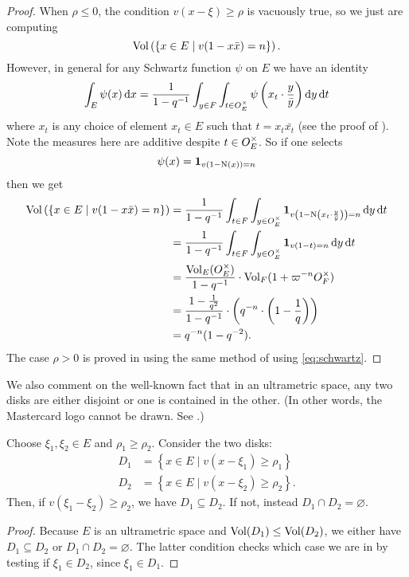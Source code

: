 \begin{proof}
  When $\rho \le 0$, the condition $v(x - \xi) \ge \rho$ is vacuously true,
  so we just are computing
  \[ \operatorname{Vol}\left( \left\{ x \in E \mid v(1-x \bar x) = n \right\} \right). \]
  However, in general for any Schwartz function $\psi$ on $E$ we have an identity
  \begin{equation}
    \int_E \psi(x) \odif x
    = \frac{1}{1-q\inv} \int_{y \in F} \int_{t \in \OO_E^\times}
    \psi\left( x_t \cdot \frac{y}{\bar y} \right) \odif y \odif t
    \label{eq:schwartz}
  \end{equation}
  where $x_t$ is any choice of element $x_t \in E$ such that $t = x_t \bar{x_t}$
  (see the proof of \cite[Lemma 4.4]{ref:AFL}).
  Note the measures here are additive despite $t \in O_E^\times$.
  So if one selects
  \[ \psi(x) = \mathbf{1}_{v(1 - \operatorname{N}(x)) = n} \]
  then we get
  \begin{align*}
    \Vol\left( \left\{ x \in E \mid v(1-x \bar x) = n \right\} \right)
    &= \frac{1}{1-q\inv} \int_{t \in F} \int_{y \in \OO_E^\times}
    \mathbf{1}_{v\left( 1 - \Norm\left(x_t \cdot \frac{y}{\bar y} \right) \right) = n} \odif y \odif t \\
    &= \frac{1}{1-q\inv} \int_{t \in F} \int_{y \in \OO_E^\times}
    \mathbf{1}_{v\left( 1 - t \right) = n} \odif y \odif t \\
    &= \frac{\Vol_E(\OO_E^\times)}{1-q\inv} \cdot \Vol_F(1 + \varpi^{-n} \OO_F^\times) \\
    &= \frac{1 - \frac{1}{q^2}}{1-q\inv}
      \cdot \left( q^{-n} \cdot \left( 1 - \frac 1q \right) \right) \\
    &= q^{-n} (1-q^{-2}).
  \end{align*}
  The case $\rho > 0$ is proved in \cite[Lemma 4.4]{ref:AFL}
  using the same method of using \eqref{eq:schwartz}.
\end{proof}

We also comment on the well-known fact that in an ultrametric space,
any two disks are either disjoint or one is contained in the other.
(In other words, the Mastercard logo cannot be drawn. See .)
\begin{lemma}
  Choose $\xi_1, \xi_2 \in E$ and $\rho_1 \geq \rho_2$.
  Consider the two disks:
  \begin{align*}
    D_1 &= \left\{ x \in E \mid v(x-\xi_1) \ge \rho_1 \right\} \\
    D_2 &= \left\{ x \in E \mid v(x-\xi_2) \ge \rho_2 \right\}.
  \end{align*}
  Then, if $v(\xi_1-\xi_2) \geq \rho_2$, we have $D_1 \subseteq D_2$.
  If not, instead $D_1 \cap D_2 = \varnothing$.
  \label{lem:no_mastercard}
\end{lemma}
\begin{proof}
  Because $E$ is an ultrametric space and $\operatorname{Vol}(D_1) \leq \operatorname{Vol}(D_2)$,
  we either have $D_1 \subseteq D_2$ or $D_1 \cap D_2 = \varnothing$.
  The latter condition checks which case we are in by testing if $\xi_1 \in D_2$,
  since $\xi_1 \in D_1$.
\end{proof}

